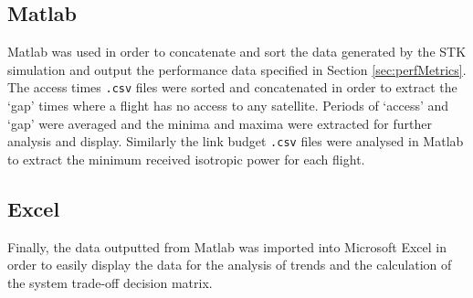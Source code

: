 \subsection{Matlab}
Matlab was used in order to concatenate and sort the data generated by the STK simulation and output the performance data specified in Section \ref{sec:perfMetrics}. The access times \Verb|.csv| files were sorted and concatenated in order to extract the `gap' times where a flight has no access to any satellite. Periods of `access' and `gap' were averaged and the minima and maxima were extracted for further analysis and display. Similarly the link budget \Verb|.csv| files were analysed in Matlab to extract the minimum received isotropic power for each flight.

\subsection{Excel}
Finally, the data outputted from Matlab was imported into Microsoft Excel in order to easily display the data for the analysis of trends and the calculation of the system trade-off decision matrix.